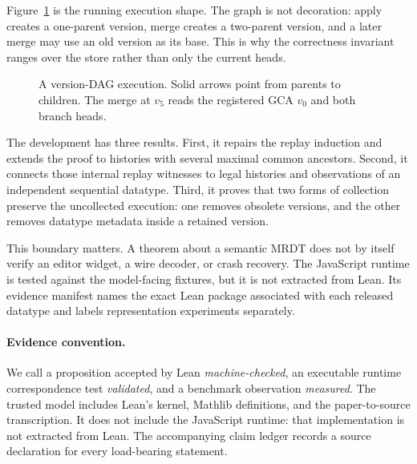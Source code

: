 Figure~\ref{fig:execution-shape} is the running execution shape. The graph is
not decoration: apply creates a one-parent version, merge creates a two-parent
version, and a later merge may use an old version as its base. This is why the
correctness invariant ranges over the store rather than only the current
heads.

\begin{figure}[H]
\centering
{}
\caption{A version-DAG execution. Solid arrows point from parents to
children. The merge at $v_5$ reads the registered GCA $v_0$ and both branch
heads.}
\label{fig:execution-shape}
\end{figure}

The development has three results. First, it repairs the replay induction and
extends the proof to histories with several maximal common ancestors. Second,
it connects those internal replay witnesses to legal histories and observations
of an independent sequential datatype. Third, it proves that two forms of
collection preserve the uncollected execution: one removes obsolete versions,
and the other removes datatype metadata inside a retained version.

This boundary matters. A theorem about a semantic MRDT does not by itself
verify an editor widget, a wire decoder, or crash recovery. The JavaScript
runtime is tested against the model-facing fixtures, but it is not extracted
from Lean. Its evidence manifest names the exact Lean package associated with
each released datatype and labels representation experiments separately.

\paragraph{Evidence convention.}
We call a proposition accepted by Lean \emph{machine-checked}, an executable
runtime correspondence test \emph{validated}, and a benchmark observation
\emph{measured}. The trusted model includes Lean's kernel, Mathlib definitions,
and the paper-to-source transcription. It does not include the JavaScript
runtime: that implementation is not extracted from Lean. The accompanying
claim ledger records a source declaration for every load-bearing statement.

